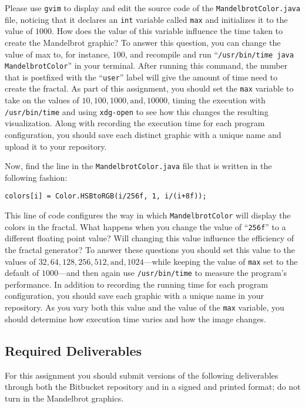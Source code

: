 Please use {\tt gvim} to display and edit the source code of the {\tt MandelbrotColor.java} file, noticing that it
declares an {\tt int} variable called {\tt max} and initializes it to the value of $1000$. How does the value of this
variable influence the time taken to create the Mandelbrot graphic? To answer this question, you can change the value of
max to, for instance, $100$, and recompile and run ``{\tt /usr/bin/time java MandelbrotColor}'' in your terminal.  After
running this command, the number that is postfixed with the ``{\tt user}'' label will give the amount of time need to create
the fractal. As part of this assignment, you should set the {\tt max} variable to take on the values of $10, 100, 1000,
\mbox{and}, 10000$, timing the execution with {\tt /usr/bin/time} and using {\tt xdg-open} to see how this changes the
resulting visualization. Along with recording the execution time for each program configuration, you should save each
distinct graphic with a unique name and upload it to your repository.

Now, find the line in the {\tt MandelbrotColor.java} file that is written in the following fashion:

{\tt colors[i] = Color.HSBtoRGB(i/256f, 1, i/(i+8f));}

\noindent This line of code configures the way in which {\tt MandelbrotColor} will display the colors in the fractal.
What happens when you change the value of ``{\tt 256f}'' to a different floating point value? Will changing this value
influence the efficiency of the fractal generator? To answer these questions you should set this value to the values of
$32, 64, 128, 256, 512, \mbox{and}, 1024$---while keeping the value of {\tt max} set to the default of $1000$---and then
again use {\tt /usr/bin/time} to measure the program's performance. In addition to recording the running time for each
program configuration, you should save each graphic with a unique name in your repository.  As you vary both this value
and the value of the {\tt max} variable, you should determine how execution time varies and how the image changes.

\vspace{-0.15in}
\subsection*{Required Deliverables}
\vspace{-0.05in}

For this assignment you should submit versions of the following deliverables through both the Bitbucket
repository and in a signed and printed format; do not turn in the Mandelbrot graphics.

